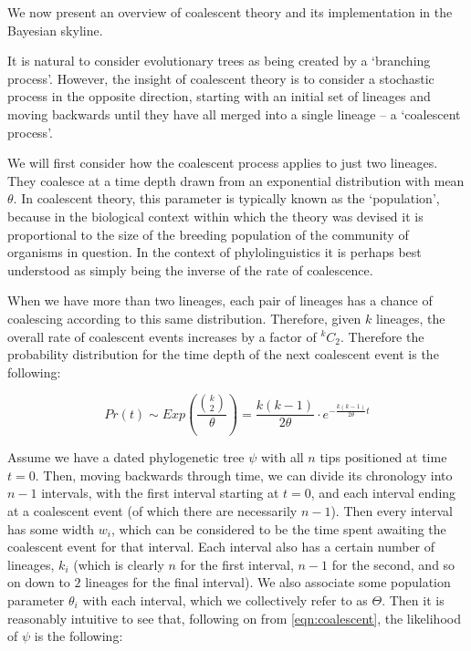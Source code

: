 \documentclass[10pt,journal,compsoc]{IEEEtran}
\begin{document}
We now present an overview of coalescent theory and its implementation in the Bayesian skyline.

It is natural to consider evolutionary trees as being created by a `branching process'. However, the insight of coalescent theory is to consider a stochastic process in the opposite direction, starting with an initial set of lineages and moving backwards until they have all merged into a single lineage -- a `coalescent process'.

We will first consider how the coalescent process applies to just two lineages. They coalesce at a time depth drawn from an exponential distribution with mean $\theta$. In coalescent theory, this parameter is typically known as the `population', because in the biological context within which the theory was devised it is proportional to the size of the breeding population of the community of organisms in question. In the context of phylolinguistics it is perhaps best understood as simply being the inverse of the rate of coalescence.

When we have more than two lineages, each pair of lineages has a chance of coalescing according to this same distribution. Therefore, given $k$ lineages, the overall rate of coalescent events increases by a factor of $^{k}C_2$. Therefore the probability distribution for the time depth of the next coalescent event is the following:

\begin{equation}\label{eqn:coalescent}
Pr(t) \sim Exp\left(\frac{\binom{k}{2}}{\theta}\right) = \frac{k(k-1)}{2\theta} \cdot e^{-\frac{k(k-1)}{2\theta} t}
\end{equation}

Assume we have a dated phylogenetic tree $\psi$ with all $n$ tips positioned at time $t=0$. Then, moving backwards through time, we can divide its chronology into $n - 1$ intervals, with the first interval starting at $t=0$, and each interval ending at a coalescent event (of which there are necessarily $n-1$). Then every interval has some width $w_i$, which can be considered to be the time spent awaiting the coalescent event for that interval. Each interval also has a certain number of lineages, $k_i$ (which is clearly $n$ for the first interval, $n - 1$ for the second, and so on down to $2$ lineages for the final interval). We also associate some population parameter $\theta_i$ with each interval, which we collectively refer to as $\Theta$. Then it is reasonably intuitive to see that, following on from \eqref{eqn:coalescent}, the likelihood of $\psi$ is the following:
\end{document}
